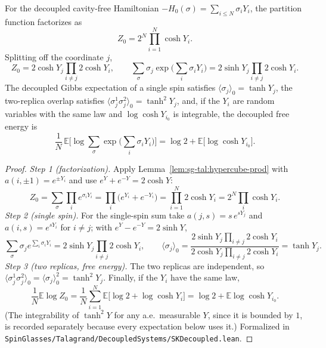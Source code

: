 \begin{theorem}\label{thm:sg-tal:decoupled-partition}
  \leanok
{}
For the decoupled cavity-free Hamiltonian $-H_0(\sigma) = \sum_{i \le N} \sigma_i Y_i$, the partition function factorizes as
\[
Z_0 = 2^N \prod_{i=1}^N \cosh Y_i.
\]
Splitting off the coordinate $j$,
\[
Z_0 = 2\cosh Y_j \prod_{i\neq j} 2\cosh Y_i,
\qquad
\sum_{\sigma}\sigma_j \exp\Big(\sum_i \sigma_i Y_i\Big) = 2\sinh Y_j \prod_{i\neq j} 2\cosh Y_i .
\]
The decoupled Gibbs expectation of a single spin satisfies $\langle \sigma_j \rangle_0 = \tanh Y_j$,
the two-replica overlap satisfies $\langle \sigma_j^1 \sigma_j^2 \rangle_0 = \tanh^2 Y_j$,
and, if the $Y_i$ are random variables with the same law and $\log\cosh Y_{i_0}$ is integrable, the decoupled free energy is
\[
\frac1N\,\mathbb{E}\Big[\log\sum_\sigma\exp\Big(\sum_i\sigma_iY_i\Big)\Big] = \log 2 + \mathbb{E}\big[\log\cosh Y_{i_0}\big].
\]
\end{theorem}
\begin{proof}
  \leanok
\emph{Step 1 (factorization).} Apply Lemma~\ref{lem:sg-tal:hypercube-prod} with $a(i,\pm1)=e^{\pm Y_i}$ and use $e^{Y}+e^{-Y}=2\cosh Y$:
\[
Z_0=\sum_\sigma\prod_ie^{\sigma_iY_i}=\prod_i\big(e^{Y_i}+e^{-Y_i}\big)=\prod_{i=1}^N2\cosh Y_i=2^N\prod_i\cosh Y_i .
\]
\emph{Step 2 (single spin).} For the single-spin sum take $a(j,s)=s\,e^{sY_j}$ and $a(i,s)=e^{sY_i}$ for $i\ne j$; with $e^{Y}-e^{-Y}=2\sinh Y$,
\[
\sum_\sigma\sigma_je^{\sum_i\sigma_iY_i}=2\sinh Y_j\prod_{i\ne j}2\cosh Y_i,\qquad
\langle\sigma_j\rangle_0=\frac{2\sinh Y_j\prod_{i\ne j}2\cosh Y_i}{2\cosh Y_j\prod_{i\ne j}2\cosh Y_i}=\tanh Y_j .
\]
\emph{Step 3 (two replicas, free energy).} The two replicas are independent, so $\langle\sigma^1_j\sigma^2_j\rangle_0=\langle\sigma_j\rangle_0^2=\tanh^2Y_j$. Finally, if the $Y_i$ have the same law,
\[
\frac1N\mathbb E\log Z_0=\frac1N\sum_{i=1}^N\mathbb E\big[\log2+\log\cosh Y_i\big]=\log2+\mathbb E\log\cosh Y_{i_0}.
\]
(The integrability of $\tanh^2Y$ for any a.e.\ measurable $Y$, since it is bounded by $1$, is recorded separately because every expectation below uses it.)
Formalized in \texttt{SpinGlasses/Talagrand/DecoupledSystems/SKDecoupled.lean}.
\end{proof}

